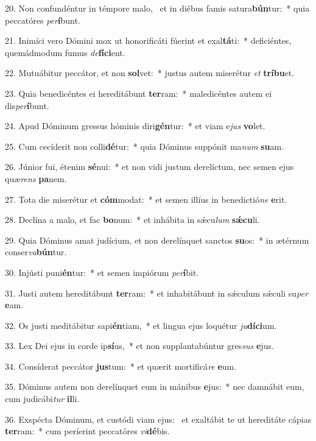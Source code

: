 20. Non confundéntur in témpore malo, \dag\  et in diébus famis satura\textbf{bún}tur:~*  quia peccatóres \textit{per}\textbf{í}bunt.\

21. Inimíci vero Dómini mox ut honorificáti fúerint et exal\textbf{tá}ti:~*  deficiéntes, quemádmodum fumus \textit{de}\textbf{fí}\textbf{ci}ent.\

22. Mutuábitur peccátor, et non \textbf{sol}vet:~*  justus autem miserétur \textit{et} \textbf{trí}\textbf{bu}et.\

23. Quia benedicéntes ei hereditábunt \textbf{ter}ram:~*  maledicéntes autem ei dis\textit{per}\textbf{í}bunt.\

24. Apud Dóminum gressus hóminis diri\textbf{gén}tur:~*  et viam e\textit{jus} \textbf{vo}let.\

25. Cum cecíderit non colli\textbf{dé}tur:~*  quia Dóminus suppónit ma\textit{num} \textbf{su}am.\

26. Júnior fui, étenim \textbf{sé}nui:~*  et non vidi justum derelíctum, nec semen ejus quæ\textit{rens} \textbf{pa}nem.\

27. Tota die miserétur et \textbf{cóm}modat:~*  et semen illíus in benedictió\textit{ne} \textbf{e}rit.\

28. Declína a malo, et fac \textbf{bo}num:~*  et inhábita in sǽcu\textit{lum} \textbf{sǽ}\textbf{cu}li.\

29. Quia Dóminus amat judícium, et non derelínquet sanctos \textbf{su}os:~*  in ætérnum conser\textit{va}\textbf{bún}tur.\

30. Injústi puni\textbf{én}tur:~*  et semen impiórum \textit{per}\textbf{í}bit.\

31. Justi autem hereditábunt \textbf{ter}ram:~*  et inhabitábunt in sǽculum sǽculi su\textit{per} \textbf{e}am.\

32. Os justi meditábitur sapi\textbf{én}tiam,~*  et lingua ejus loquétur \textit{ju}\textbf{dí}\textbf{ci}um.\

33. Lex Dei ejus in corde ip\textbf{sí}us,~*  et non supplantabúntur gres\textit{sus} \textbf{e}jus.\

34. Consíderat peccátor \textbf{jus}tum:~*  et quærit mortificá\textit{re} \textbf{e}um.\

35. Dóminus autem non derelínquet eum in mánibus \textbf{e}jus:~*  nec damnábit eum, cum judicábi\textit{tur} \textbf{il}li.\

36. Exspécta Dóminum, et custódi viam ejus: \dag\  et exaltábit te ut hereditáte cápias \textbf{ter}ram:~*  cum períerint peccatóres \textit{vi}\textbf{dé}bis.\

